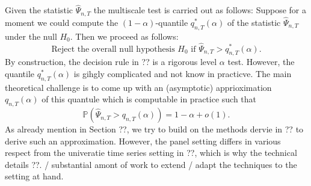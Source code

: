 \documentclass[a4paper,12pt]{article}
\begin{document}
Given the statistic $\hat{\Psi}_{n,T}$ the multiscale test is carried out as follows: Suppose for a moment we could compute the $(1-\alpha)$-quantile $q_{n,T}^*(\alpha)$ of the statistic $\hat{\Psi}_{n,T}$ under the null $H_0$. Then we proceed as follows: 
\[ \text{Reject the overall null hypothesis } H_0 \text{ if } \hat{\Psi}_{n,T} > q_{n,T}^*(\alpha). \]
By construction, the decision rule in ?? is a rigorous level $\alpha$ test. However, the quantile $q_{n,T}^*(\alpha)$ is gihgly complicated and not know in practicve. The main theoretical challenge is to come up with an (asymptotic) apprioximation $q_{n,T}(\alpha)$ of this quantule which is computable in practice such that 
\[ \mathbb{P} (\hat{\Psi}_{n,T} > q_{n,T}(\alpha)) = 1-\alpha + o(1). \]
As already mention in Section ??, we try to build on the methods dervie in ?? to derive such an approximation. However, the panel setting differs in various respect from the univeratie time series setting in ??, which is why the technical details ??. / substantial amont of work to extend / adapt the techniques to the setting at hand. 
\end{document}

